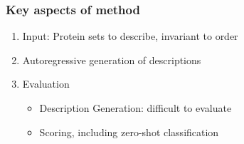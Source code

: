 \documentclass{beamer}
\begin{document}
\begin{frame}
\frametitle{Key aspects of method}
\begin{enumerate}
    \item{Input: Protein sets to describe, invariant to order}\pause
    \item{Autoregressive generation of descriptions}\pause
    \item{Evaluation}\pause
        \begin{itemize}
            \item{Description Generation: difficult to evaluate}\pause
            \item{Scoring, including zero-shot classification}\pause


\end{itemize}
\end{enumerate}
\end{frame}
\end{document}
